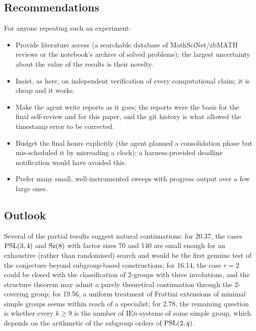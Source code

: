 \subsection{Recommendations}
For anyone repeating such an experiment:
\begin{itemize}
\item Provide literature access (a searchable database of MathSciNet/zbMATH reviews or the notebook's archive of
solved problems); the largest uncertainty about the value of the results is their novelty.
\item Insist, as here, on independent verification of every computational claim; it is cheap and it works.
\item Make the agent write reports as it goes; the reports were the basis for the final self-review and for this
paper, and the git history is what allowed the timestamp error to be corrected.
\item Budget the final hours explicitly (the agent planned a consolidation phase but mis-scheduled it by misreading a
clock); a harness-provided deadline notification would have avoided this.
\item Prefer many small, well-instrumented sweeps with progress output over a few large ones.
\end{itemize}

\subsection{Outlook}
Several of the partial results suggest natural continuations: for 20.37, the cases $\mathrm{PSL}(3,4)$ and $\mathrm{Sz}(8)$ with
factor sizes 70 and 140 are small enough for an exhaustive (rather than randomised) search and would be the first
genuine test of the conjecture beyond subgroup-based constructions; for 16.14, the case $r=2$ could be closed with
the classification of 2-groups with three involutions, and the structure theorem may admit a purely theoretical
continuation through the 2-covering group; for 19.56, a uniform treatment of Frattini extensions of minimal simple
groups seems within reach of a specialist; for 2.78, the remaining question is whether every $k\ge 9$ is the
number of $\mathrm{IE}\bar n$-systems of some simple group, which depends on the arithmetic of the subgroup orders
of $\mathrm{PSL}(2,q)$.
